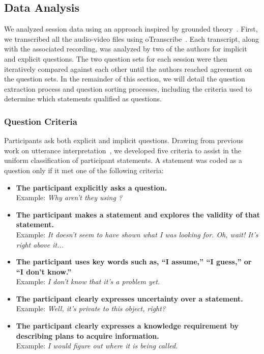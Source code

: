 \documentclass{acm_proc_article-sp}
\newcommand{\compresslist}{
	\vspace{-1em}
	\setlength{\itemsep}{1pt}
	\setlength{\parskip}{0pt}
	\setlength{\parsep}{0pt}
}
\begin{document}
\subsection{Data Analysis}
\label{dataAnalysis}
We analyzed session data using an approach inspired by grounded theory~\cite{glaser2009discovery}. 
First, we transcribed all the audio-video files using oTranscribe~\cite{OTranscribe}.
Each transcript, along with the associated recording, was analyzed by two of the authors for implicit and explicit questions. 
The two question sets for each session were then iteratively compared against each other until the authors reached agreement on the question sets. 
In the remainder of this section, we will detail the question extraction process and question sorting processes, including the criteria used to determine which statements qualified as questions.
\subsubsection{Question Criteria}
Participants ask both explicit and implicit questions. 
Drawing from previous work on utterance interpretation~\cite{letovsky1987cognitive}, we developed five criteria to assist in the uniform classification of participant statements. 
A statement was coded as a question only if it met one of the following criteria:

\begin{itemize}
\compresslist	
\item \textbf{The participant explicitly asks a question.}
\\ Example: \textit{Why aren't they using ?}
\item \textbf{The participant makes a statement and explores the validity of that statement.}
\\ Example: \textit{It doesn't seem to have shown what I was looking for. Oh, wait! It's right above it...}
\item \textbf{The participant uses key words such as, ``I assume,'' ``I guess,'' or ``I don't know.''}
\\ Example: \textit{I don't know that it's a problem yet.}
\item \textbf{The participant clearly expresses uncertainty over a statement.}
\\ Example: \textit{Well, it's private to this object, right?}
\item \textbf{The participant clearly expresses a knowledge requirement by describing plans to acquire information.}
\\ Example: \textit{I would figure out where it is being called.}

\end{itemize}
\end{document}

